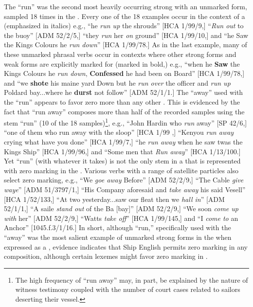 The  “run” was the second most heavily occurring strong  with an unmarked  form, sampled 18 times in the . Every one of the 18 examples occur in the context of a  (emphasized in italics) e.g., “he \textit{run up} the shrouds” [HCA 1/99/9,] “\textit{Run out} to the buoy” [ADM 52/2/5,] “they \textit{run} her \textit{on} ground” [HCA 1/99/10,] and “he Saw the Kings Colours he \textit{run down}” [HCA 1/99/78.] As in the last example, many of these unmarked phrasal verbs occur in contexts where other strong  forms and weak  forms are explicitly marked for  (marked in bold,) e.g., “when he \textbf{Saw} the Kings Colours he \textit{run down}, \textbf{Confessed} he had been on Board” [HCA 1/99/78,] and “we \textbf{shote} his maine yard Down but he \textit{run over} the officer and \textit{run up} Poldard bay...where he \textbf{durst} not follow” [ADM 52/1/1.] The  “away” used with the  “run” appears to favor zero  more than any other . This is evidenced by the fact that “run away” composes more than half of the recorded samples using the  stem “run” (10 of the 18 samples)\footnote{The high frequency of “run away” may, in part, be explained by the nature of witness testimony coupled with the number of court cases related to sailors deserting their vessel.}, e.g., “John Hardin who \textit{run} away” [SP 42/6,] “one of them who run away with the sloop” [HCA 1/99  \citealt{Islands1722},] “Kenyou \textit{run away} crying what have you done” [HCA 1/99/7,] “he \textit{run away} when he saw twas the Kings Ship” [HCA 1/99/96,] and “Some men that \textit{Run away}” [HCA 1/13/100.] Yet “run” (with whatever  it takes) is not the only  stem in a  that is represented with zero marking in the . Various  verbs with a range of satellite particles also select zero marking, e.g., “We \textit{goe away} Before” [ADM 52/2/9,] “The Cable \textit{give waye}” [ADM 51/3797/1,] “His Company aforesaid and \textit{take away} his said Vesell” [HCA 1/52/133,] “At two yesterday...saw our fleat then we \textit{hall in}” [ADM 52/1/1,] “A saile \textit{stand out} of the Ba [bay]” [ADM 52/2/9,] “We soon \textit{come up with} her” [ADM 52/2/9,] “Watts \textit{take off}” [HCA 1/99/145,] and “I \textit{come to} an Anchor” [1045.f.3/1/16.] In short, although “run,” specifically used with the  “away” was the most salient example of unmarked strong  forms in the  when expressed as a , evidence indicates that Ship English permits zero marking in any  composition, although certain lexemes might favor zero marking in . 

